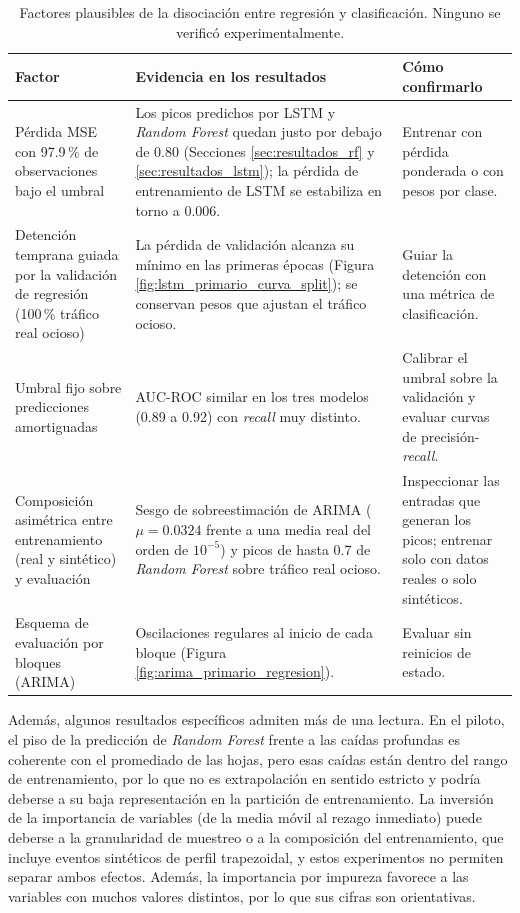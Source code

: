 \documentclass[12pt]{report}
\begin{document}
\begin{table}[H]
    \centering
    \small
    \begin{tabular}{|p{3.2cm}|p{5.3cm}|p{5.3cm}|}
        \hline
        \textbf{Factor} & \textbf{Evidencia en los resultados} & \textbf{Cómo confirmarlo} \\
        \hline
        Pérdida MSE con 97.9\,\% de observaciones bajo el umbral & Los picos predichos por LSTM y \textit{Random Forest} quedan justo por debajo de 0.80 (Secciones \ref{sec:resultados_rf} y \ref{sec:resultados_lstm}); la pérdida de entrenamiento de LSTM se estabiliza en torno a 0.006. & Entrenar con pérdida ponderada o con pesos por clase. \\
        \hline
        Detención temprana guiada por la validación de regresión (100\,\% tráfico real ocioso) & La pérdida de validación alcanza su mínimo en las primeras épocas (Figura \ref{fig:lstm_primario_curva_split}); se conservan pesos que ajustan el tráfico ocioso. & Guiar la detención con una métrica de clasificación. \\
        \hline
        Umbral fijo sobre predicciones amortiguadas & AUC-ROC similar en los tres modelos (0.89 a 0.92) con \textit{recall} muy distinto. & Calibrar el umbral sobre la validación y evaluar curvas de precisión-\textit{recall}. \\
        \hline
        Composición asimétrica entre entrenamiento (real y sintético) y evaluación & Sesgo de sobreestimación de ARIMA ($\mu=0.0324$ frente a una media real del orden de $10^{-5}$) y picos de hasta 0.7 de \textit{Random Forest} sobre tráfico real ocioso. & Inspeccionar las entradas que generan los picos; entrenar solo con datos reales o solo sintéticos. \\
        \hline
        Esquema de evaluación por bloques (ARIMA) & Oscilaciones regulares al inicio de cada bloque (Figura \ref{fig:arima_primario_regresion}). & Evaluar sin reinicios de estado. \\
        \hline
    \end{tabular}
    \caption{Factores plausibles de la disociación entre regresión y clasificación. Ninguno se verificó experimentalmente.}
    \label{tab:hipotesis_disociacion}
\end{table}

Además, algunos resultados específicos admiten más de una lectura. En el piloto, el piso de la predicción de \textit{Random Forest} frente a las caídas profundas es coherente con el promediado de las hojas, pero esas caídas están dentro del rango de entrenamiento, por lo que no es extrapolación en sentido estricto y podría deberse a su baja representación en la partición de entrenamiento. La inversión de la importancia de variables (de la media móvil al rezago inmediato) puede deberse a la granularidad de muestreo o a la composición del entrenamiento, que incluye eventos sintéticos de perfil trapezoidal, y estos experimentos no permiten separar ambos efectos. Además, la importancia por impureza favorece a las variables con muchos valores distintos, por lo que sus cifras son orientativas.
\end{document}
